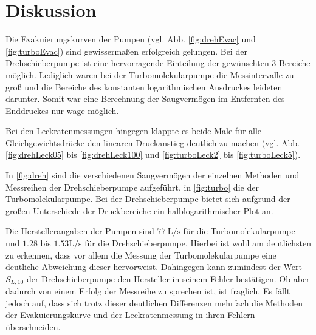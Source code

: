 \section{Diskussion}
\label{sec:Diskussion}
Die Evakuierungskurven der Pumpen (vgl. Abb. \ref{fig:drehEvac} und \ref{fig:turboEvac}) sind gewissermaßen erfolgreich gelungen.
Bei der Drehschieberpumpe ist eine hervorragende Einteilung der gewünschten 3 Bereiche möglich.
Lediglich waren bei der Turbomolekularpumpe die Messintervalle zu groß und die Bereiche des konstanten logarithmischen Ausdruckes leideten darunter.
Somit war eine Berechnung der Saugvermögen im Entfernten des Enddruckes nur wage möglich.

Bei den Leckratenmessungen hingegen klappte es beide Male für alle Gleichgewichtsdrücke den linearen Druckanstieg deutlich zu machen 
(vgl. Abb. \ref{fig:drehLeck05} bis \ref{fig:drehLeck100} und \ref{fig:turboLeck2} bis \ref{fig:turboLeck5}).

In \autoref{fig:dreh} sind die verschiedenen Saugvermögen der einzelnen Methoden und Messreihen der Drehschieberpumpe aufgeführt,
in \autoref{fig:turbo} die der Turbomolekularpumpe. Bei der Drehschieberpumpe bietet sich aufgrund der großen Unterschiede der Druckbereiche
ein halblogarithmischer Plot an.

Die Herstellerangaben der Pumpen sind $\qty{77}{\liter\per\second}$ für die Turbomolekularpumpe und $1.28$ bis $1.53 \unit{\liter\per\second}$ für die Drehschieberpumpe.
Hierbei ist wohl am deutlichsten zu erkennen, dass vor allem die Messung der Turbomolekularpumpe eine deutliche Abweichung dieser hervorweist.
Dahingegen kann zumindest der Wert $S_{L,10}$ der Drehschieberpumpe den Hersteller in seinem Fehler bestätigen. Ob aber dadurch von einem Erfolg der Messreihe zu sprechen ist, ist fraglich.
Es fällt jedoch auf, dass sich trotz dieser deutlichen Differenzen mehrfach die Methoden der Evakuierungskurve und der Leckratenmessung in ihren Fehlern überschneiden.


